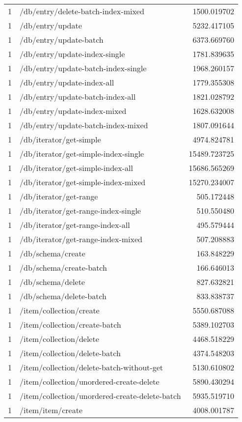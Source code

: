 \begin{longtable}{rlr}
1 & /db/entry/delete-batch-index-mixed & 1500.019702 \\
1 & /db/entry/update & 5232.417105 \\
1 & /db/entry/update-batch & 6373.669760 \\
1 & /db/entry/update-index-single & 1781.839635 \\
1 & /db/entry/update-batch-index-single & 1968.260157 \\
1 & /db/entry/update-index-all & 1779.355308 \\
1 & /db/entry/update-batch-index-all & 1821.028792 \\
1 & /db/entry/update-index-mixed & 1628.632008 \\
1 & /db/entry/update-batch-index-mixed & 1807.091644 \\
1 & /db/iterator/get-simple & 4974.824781 \\
1 & /db/iterator/get-simple-index-single & 15489.723725 \\
1 & /db/iterator/get-simple-index-all & 15686.565269 \\
1 & /db/iterator/get-simple-index-mixed & 15270.234007 \\
1 & /db/iterator/get-range & 505.172448 \\
1 & /db/iterator/get-range-index-single & 510.550480 \\
1 & /db/iterator/get-range-index-all & 495.579444 \\
1 & /db/iterator/get-range-index-mixed & 507.208883 \\
1 & /db/schema/create & 163.848229 \\
1 & /db/schema/create-batch & 166.646013 \\
1 & /db/schema/delete & 827.632821 \\
1 & /db/schema/delete-batch & 833.838737 \\
1 & /item/collection/create & 5550.687088 \\
1 & /item/collection/create-batch & 5389.102703 \\
1 & /item/collection/delete & 4468.518229 \\
1 & /item/collection/delete-batch & 4374.548203 \\
1 & /item/collection/delete-batch-without-get & 5130.610802 \\
1 & /item/collection/unordered-create-delete & 5890.430294 \\
1 & /item/collection/unordered-create-delete-batch & 5935.519710 \\
1 & /item/item/create & 4008.001787 \\

\end{longtable}
